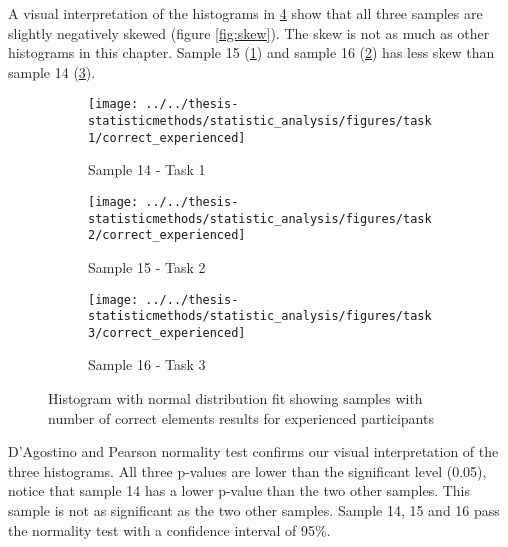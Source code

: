 A visual interpretation of the histograms in \ref{fig:sample14,15,16_normhistogram} show that all three samples are slightly negatively skewed (figure \ref{fig:skew}). The skew is not as much as other histograms in this chapter. Sample 15 (\ref{fig:correctexperienced_task1}) and sample 16 (\ref{fig:correctexperienced_task2}) has less skew than sample 14 (\ref{fig:correctexperienced_task3}).  

\begin{figure}[H]
	\centering
	\begin{subfigure}[b]{0.32\textwidth}
		\centering
		\texttt{[image: ../../thesis-statisticmethods/statistic\_analysis/figures/task1/correct\_experienced]}
		\caption{Sample 14 - Task 1}
		\label{fig:correctexperienced_task1}
	\end{subfigure}
	\begin{subfigure}[b]{0.32\textwidth}
		\centering
		\texttt{[image: ../../thesis-statisticmethods/statistic\_analysis/figures/task2/correct\_experienced]}
		\caption{Sample 15 - Task 2}
		\label{fig:correctexperienced_task2}
	\end{subfigure}
	\begin{subfigure}[b]{0.32\textwidth}
		\centering
		\texttt{[image: ../../thesis-statisticmethods/statistic\_analysis/figures/task3/correct\_experienced]}
		\caption{Sample 16 - Task 3}
		\label{fig:correctexperienced_task3}
	\end{subfigure}
	\caption{Histogram with normal distribution fit showing samples with number of correct elements results for experienced participants}
	\label{fig:sample14,15,16_normhistogram}
\end{figure}

  D'Agostino and Pearson normality test confirms our visual interpretation of the three histograms. All three p-values are lower than the significant level (0.05), notice that sample 14 has a lower p-value than the two other samples. This sample is not as significant as the two other samples. Sample 14, 15 and 16 pass the normality test with a confidence interval of 95\%. \\[0.2cm]

